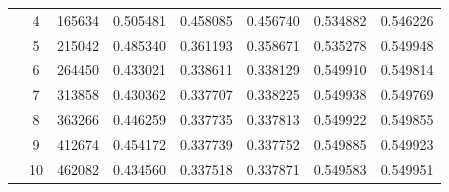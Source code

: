 \begin{tabular}{c c |  c  c  c  c  c }
 & 4 & 165634 & 0.505481 & 0.458085 & 0.456740 & 0.534882 & 0.546226 \\
 & 5 & 215042 & 0.485340 & 0.361193 & 0.358671 & 0.535278 & 0.549948 \\
 & 6 & 264450 & 0.433021 & 0.338611 & 0.338129 & 0.549910 & 0.549814 \\
 & 7 & 313858 & 0.430362 & 0.337707 & 0.338225 & 0.549938 & 0.549769 \\
 & 8 & 363266 & 0.446259 & 0.337735 & 0.337813 & 0.549922 & 0.549855 \\
 & 9 & 412674 & 0.454172 & 0.337739 & 0.337752 & 0.549885 & 0.549923 \\
 & 10 & 462082 & 0.434560 & 0.337518 & 0.337871 & 0.549583 & 0.549951 \\
\hline
\end{tabular}


